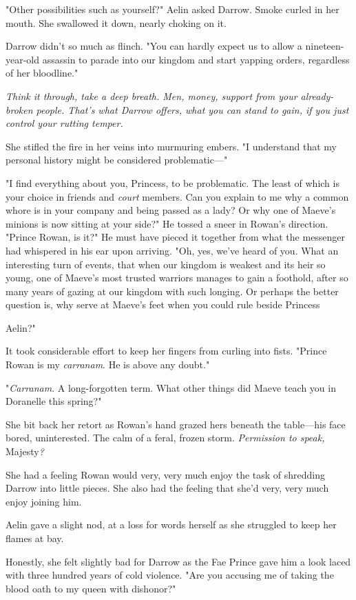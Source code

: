 "Other possibilities such as yourself?" Aelin asked Darrow. Smoke curled in her mouth. She swallowed it down, nearly choking on it.

Darrow didn't so much as flinch. "You can hardly expect us to allow a nineteen-year-old assassin to parade into our kingdom and start yapping orders, regardless of her bloodline."

\emph{Think it through, take a deep breath. Men, money, support from your already-broken people. That's what Darrow offers, what you can stand to gain, if you just control your rutting temper.}

She stifled the fire in her veins into murmuring embers. "I understand that my personal history might be considered problematic---"

"I find everything about you, Princess, to be problematic. The least of which is your choice in friends and \emph{court} members. Can you explain to me why a common whore is in your company and being passed as a lady? Or why one of Maeve's minions is now sitting at your side?" He tossed a sneer in Rowan's direction. "Prince Rowan, is it?" He must have pieced it together from what the messenger had whispered in his ear upon arriving. "Oh, yes, we've heard of you. What an interesting turn of events, that when our kingdom is weakest and its heir so young, one of Maeve's most trusted warriors manages to gain a foothold, after so many years of gazing at our kingdom with such longing. Or perhaps the better question is, why serve at Maeve's feet when you could rule beside Princess

Aelin?"

It took considerable effort to keep her fingers from curling into fists. "Prince Rowan is my \emph{carranam}. He is above any doubt."

"\emph{Carranam}. A long-forgotten term. What other things did Maeve teach you in Doranelle this spring?"

She bit back her retort as Rowan's hand grazed hers beneath the table---his face bored, uninterested. The calm of a feral, frozen storm.
\emph{Permission to speak,} Majesty\emph{?}

She had a feeling Rowan would very, very much enjoy the task of shredding Darrow into little pieces. She also had the feeling that she'd very, very much enjoy joining him.

Aelin gave a slight nod, at a loss for words herself as she struggled to keep her flames at bay.

Honestly, she felt slightly bad for Darrow as the Fae Prince gave him a look laced with three hundred years of cold violence. "Are you accusing me of taking the blood oath to my queen with dishonor?"

